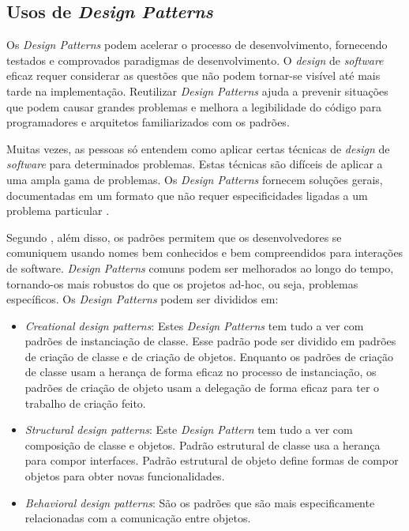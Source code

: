 \subsection{Usos de \emph{Design Patterns}}

Os \emph{Design Patterns} podem acelerar o processo de desenvolvimento, fornecendo testados e comprovados paradigmas de desenvolvimento. O \emph{design} de \emph{software} eficaz requer considerar as questões que não podem tornar-se visível até mais tarde na implementação. Reutilizar \emph{Design Patterns} ajuda a prevenir situações que podem causar grandes problemas e melhora a legibilidade do código para programadores e arquitetos familiarizados com os padrões.

Muitas vezes, as pessoas só entendem como aplicar certas técnicas de \emph{design} de \emph{software} para determinados problemas. Estas técnicas são difíceis de aplicar a uma ampla gama de problemas. Os \emph{Design Patterns} fornecem soluções gerais, documentadas em um formato que não requer especificidades ligadas a um problema particular \cite{shalloway2004design}.

Segundo \cite{shalloway2004design}, além disso, os padrões permitem que os desenvolvedores se comuniquem usando nomes bem conhecidos e bem compreendidos para interações de software. \emph{Design Patterns} comuns podem ser melhorados ao longo do tempo, tornando-os mais robustos do que os projetos ad-hoc, ou seja, problemas específicos. Os \emph{Design Patterns} podem ser divididos em:

\begin{itemize}
\item \emph{Creational design patterns}: Estes \emph{Design Patterns} tem tudo a ver com padrões de instanciação de classe. Esse padrão pode ser dividido em padrões de criação de classe e de criação de objetos. Enquanto os padrões de criação de classe usam a herança de forma eficaz no processo de instanciação, os padrões de criação de objeto usam a delegação de forma eficaz para ter o trabalho de criação feito. 
\item \emph{Structural design patterns}: Este \emph{Design Pattern} tem tudo a ver com composição de classe e objetos. Padrão estrutural de classe usa a herança para compor interfaces. Padrão estrutural de objeto define formas de compor objetos para obter novas funcionalidades.
\item \emph{Behavioral design patterns}: São os padrões que são mais especificamente relacionadas com a comunicação entre objetos.
\end{itemize}

